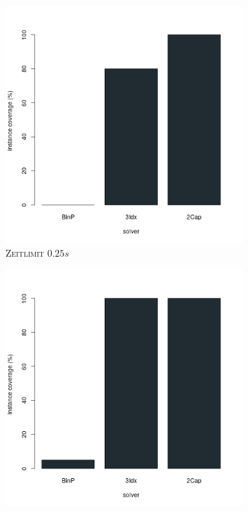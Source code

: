 \begin{figure}[H]
\centering

\begin{subfigure}[b]{0.3\textwidth}
\centering
\includegraphics[width=1.2\textwidth]{img/solver_instance_coverage_b=2_s_0_25s.png}
\caption{\textsc{Zeitlimit $0.25s$}}
\label{fig:instance_cov_b=2_s_a}
\end{subfigure}
\hfill
\begin{subfigure}[b]{0.3\textwidth}
\centering
\includegraphics[width=1.2\textwidth]{img/solver_instance_coverage_b=2_s_0_5s.png}

\end{subfigure}
\end{figure}
